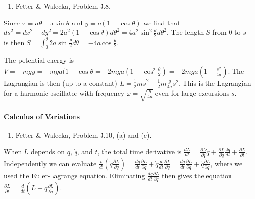 \documentclass[letterpaper,11pt]{article}
\begin{document}
\begin{enumerate}[resume]
 \item Fetter \& Walecka, Problem 3.8.
\end{enumerate}
Since $x = a\theta - a\sin\theta$ and $y = a(1 - \cos\theta)$ we find that $ds^2 = dx^2 + dy^2 = 2a^2(1-\cos\theta)d\theta^2 = 4a^2\sin^2\frac{\theta}{2}d\theta^2$.  The length $S$ from 0 to $s$ is then $S = \int_0^\theta 2a\sin\frac{\theta}{2}d\theta = -4a\cos\frac{\theta}{2}$.

The potential energy is $V = -mgy = -mga(1-\cos\theta = -2mga(1-\cos^2\frac{\theta}{2}) = -2mga\left(1 - \frac{s^2}{4a}\right)$.  The Lagrangian is then (up to a constant) $L = \frac{1}{2}m\dot{s}^2 + \frac{1}{2}m\frac{g}{4a}s^2$.  This is the Lagrangian for a harmonic oscillator with frequency $\omega = \sqrt{\frac{g}{4a}}$ even for large excursions $s$.

\paragraph*{Calculus of Variations}
\begin{enumerate}[resume]
 \item Fetter \& Walecka, Problem 3.10, (a) and (c).
\end{enumerate}
When $L$ depends on $q$, $\dot{q}$, and $t$, the total time derivative is $\frac{dL}{dt} = \frac{\partial L}{\partial q} \dot{q} + \frac{\partial L}{\partial \dot{q}} \frac{d\dot{q}}{dt} + \frac{\partial L}{\partial t}$.  Independently we can evaluate $\frac{d}{dt} \left( \dot{q} \frac{\partial L}{\partial \dot{q}} \right) = \frac{d\dot{q}}{dt} \frac{\partial L}{\partial \dot{q}} + \dot{q} \frac{d}{dt} \frac{\partial L}{\partial \dot{q}} = \frac{d\dot{q}}{dt} \frac{\partial L}{\partial \dot{q}} + \dot{q} \frac{\partial L}{\partial q}$, where we used the Euler-Lagrange equation.  Eliminating $\frac{d\dot{q}}{dt} \frac{\partial L}{\partial \dot{q}}$ then gives the equation $\frac{\partial L}{\partial t} = \frac{d}{dt} \left( L - \dot{q} \frac{\partial L}{\partial \dot{q}} \right)$.
\end{document}
